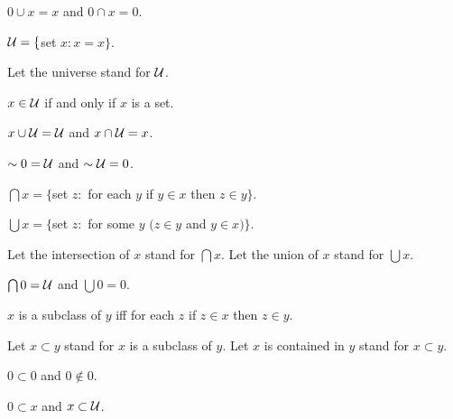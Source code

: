 \documentclass[a4paper,draft]{amsproc}
\begin{document}
\begin{forthel}
\begin{theorem}
$0 \cup x = x$ and $0 \cap x = 0$.
\end{theorem}

\begin{definition}
	$\cal{U} = \{$set $x : x = x\}$.
\end{definition}
Let the universe stand for $\cal{U}$.

\begin{theorem}
$x \in \cal{U}$ if and only if $x$ is a set.
\end{theorem}

\begin{theorem}
$x \cup \cal{U} = \cal{U}$ and $x \cap \cal{U} = x$.
\end{theorem}

\begin{theorem}
$\sim 0 = \cal{U}$ and $\sim \cal{U} = 0$.
\end{theorem}

\begin{definition} $\bigcap x = 
\{$set $z :$ for each $y$ if $y \in x$ then $z \in y\}$.\end{definition}

\begin{definition} $\bigcup x = 
\{$set $z :$ for some $y$ $(z \in y$ and $y \in x)\}$.\end{definition}

Let the intersection of $x$ stand for $\bigcap x$.
Let the union of $x$ stand for $\bigcup x$.

\begin{theorem}
$\bigcap 0 = \cal{U}$ and $\bigcup 0 = 0$.
\end{theorem}

\begin{definition} $x$ is a subclass of $y$ iff 
for each $z$ if $z \in x$ then $z \in y$.
\end{definition}

Let $x \subset y$ stand for $x$ is a subclass of $y$.
Let $x$ is contained in $y$ stand for $x \subset y$.

\begin{lemma*}
$0 \subset 0$ and $0 \notin 0$.
\end{lemma*}

\begin{theorem}
$0 \subset x$ and $x \subset \cal{U}$.
\end{theorem}


\end{forthel}
\end{document}
